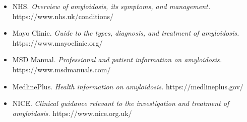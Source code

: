 \begin{itemize}
    \item NHS. \textit{Overview of amyloidosis, its symptoms, and management.} https://www.nhs.uk/conditions/
    \item Mayo Clinic. \textit{Guide to the types, diagnosis, and treatment of amyloidosis.} https://www.mayoclinic.org/
    \item MSD Manual. \textit{Professional and patient information on amyloidosis.} https://www.msdmanuals.com/
    \item MedlinePlus. \textit{Health information on amyloidosis.} https://medlineplus.gov/
    \item NICE. \textit{Clinical guidance relevant to the investigation and treatment of amyloidosis.} https://www.nice.org.uk/
\end{itemize}

